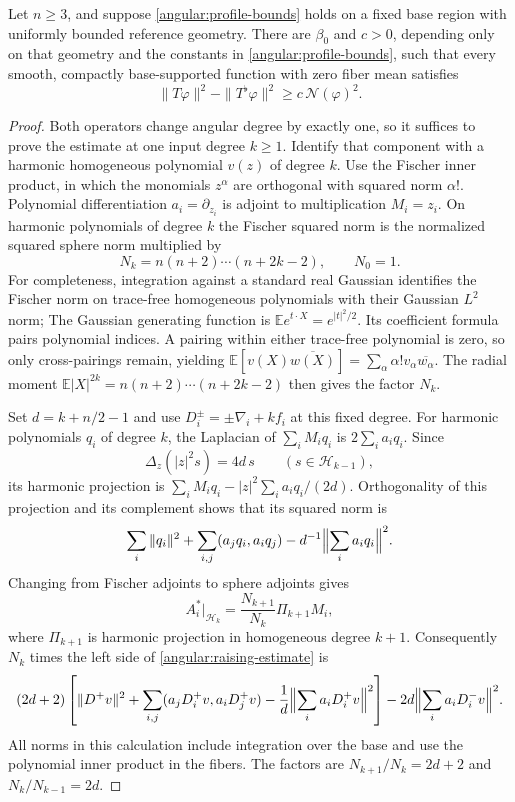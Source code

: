 \begin{lemma}\label{angular:raising}
Let $n\ge3$, and suppose \eqref{angular:profile-bounds} holds on a fixed
base region with uniformly bounded reference geometry.  There are
$\beta_0$ and $c>0$, depending only on that geometry and the constants in
\eqref{angular:profile-bounds}, such that every smooth, compactly
base-supported function with zero fiber mean satisfies
\begin{equation}\label{angular:raising-estimate}
 \|T\varphi\|^2-\|T^\flat\varphi\|^2
       \ge c\,\mathcal N(\varphi)^2.
\end{equation}
\end{lemma}

\begin{proof}
Both operators change angular degree by exactly one, so it suffices to
prove the estimate at one input degree $k\ge1$.  Identify that component
with a harmonic homogeneous polynomial $v(z)$ of degree $k$.  Use the
Fischer inner product, in which the monomials $z^\alpha$ are orthogonal
with squared norm $\alpha!$.  Polynomial differentiation $a_i=\partial_{z_i}$
is adjoint to multiplication $M_i=z_i$.  On harmonic polynomials of degree
$k$ the Fischer squared norm is the normalized squared sphere norm
multiplied by
\[
 N_k=n(n+2)\cdots(n+2k-2),\qquad N_0=1.
\]
For completeness, integration against a standard real Gaussian identifies
the Fischer norm on trace-free homogeneous polynomials with their
Gaussian $L^2$ norm;
The Gaussian generating function is $\mathbb E e^{t\cdot X}=e^{|t|^2/2}$.
Its coefficient formula pairs polynomial indices. A pairing within either
trace-free polynomial is zero, so only cross-pairings remain, yielding
$\mathbb E[v(X)\overline{w(X)}]=\sum_\alpha\alpha!v_\alpha\overline{w_\alpha}$.
The radial moment $\mathbb E|X|^{2k}=n(n+2)\cdots(n+2k-2)$
then gives the factor $N_k$.

Set $d=k+n/2-1$ and use $D_i^\pm=\pm\nabla_i+k f_i$ at this fixed degree.
For harmonic polynomials $q_i$ of degree $k$, the Laplacian of
$\sum_iM_iq_i$ is $2\sum_i a_iq_i$.  Since
\[
 \Delta_z(|z|^2s)=4d\,s\qquad(s\in\mathcal H_{k-1}),
\]
its harmonic projection is
$\sum_iM_iq_i-|z|^2\sum_i a_iq_i/(2d)$.  Orthogonality of this projection
and its complement shows that its squared norm is
\[
 \sum_i\|q_i\|^2+\sum_{i,j}(a_jq_i,a_iq_j)
             -d^{-1}\Bigl\|\sum_i a_iq_i\Bigr\|^2.
\]
Changing from Fischer adjoints to sphere adjoints gives
\[
 A_i^*|_{\mathcal H_k}
   =\frac{N_{k+1}}{N_k}\Pi_{k+1}M_i,
\]
where $\Pi_{k+1}$ is harmonic projection in homogeneous degree $k+1$.
Consequently $N_k$ times the left side of
\eqref{angular:raising-estimate} is
\begin{equation}\label{angular:Fock-difference}
 \begin{split}
 (2d+2)\left[\|D^+v\|^2
   +\sum_{i,j}(a_jD_i^+v,a_iD_j^+v)
   -\frac1d\Bigl\|\sum_i a_iD_i^+v\Bigr\|^2\right]
 -2d\Bigl\|\sum_i a_iD_i^-v\Bigr\|^2.
 \end{split}
\end{equation}
All norms in this calculation include integration over the base and use
the polynomial inner product in the fibers.  The factors are
$N_{k+1}/N_k=2d+2$ and $N_k/N_{k-1}=2d$.


\end{proof}
